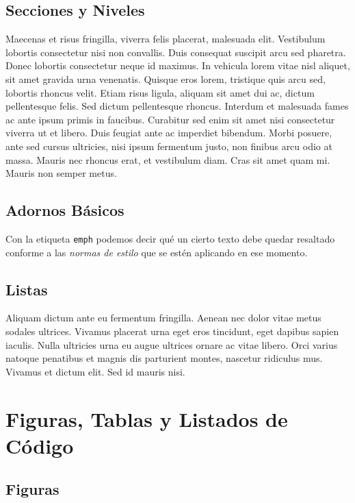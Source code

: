 \documentclass{article}
\begin{document}
\subsection{Secciones y Niveles}

Maecenas et risus fringilla, viverra felis placerat, malesuada elit. Vestibulum lobortis consectetur nisi non convallis. Duis consequat suscipit arcu sed pharetra. Donec lobortis consectetur neque id maximus. In vehicula lorem vitae nisl aliquet, sit amet gravida urna venenatis. Quisque eros lorem, tristique quis arcu sed, lobortis rhoncus velit. Etiam risus ligula, aliquam sit amet dui ac, dictum pellentesque felis. Sed dictum pellentesque rhoncus. Interdum et malesuada fames ac ante ipsum primis in faucibus. Curabitur sed enim sit amet nisi consectetur viverra ut et libero. Duis feugiat ante ac imperdiet bibendum. Morbi posuere, ante sed cursus ultricies, nisi ipsum fermentum justo, non finibus arcu odio at massa. Mauris nec rhoncus erat, et vestibulum diam. Cras sit amet quam mi. Mauris non semper metus.

\subsection{Adornos Básicos}

Con la etiqueta \texttt{emph} podemos decir qué un cierto texto debe quedar resaltado conforme a las \emph{normas de estilo} que se estén aplicando en ese momento.

\subsection{Listas}

Aliquam dictum ante eu fermentum fringilla. Aenean nec dolor vitae metus sodales ultrices. Vivamus placerat urna eget eros tincidunt, eget dapibus sapien iaculis. Nulla ultricies urna eu augue ultrices ornare ac vitae libero. Orci varius natoque penatibus et magnis dis parturient montes, nascetur ridiculus mus. Vivamus et dictum elit. Sed id mauris nisi.

\section{Figuras, Tablas y Listados de Código}

\subsection{Figuras}
\end{document}
